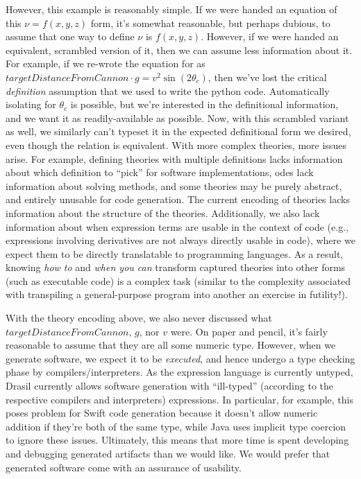 However, this example is reasonably simple. If we were handed an equation of
this \(\nu{} = f(x,y,z)\) form, it's somewhat reasonable, but perhaps dubious,
to assume that one way to define \(\nu{}\) is \(f(x,y,z)\). However, if we were
handed an equivalent, scrambled version of it, then we can assume less
information about it. For example, if we re-wrote the equation for
 as \(\mathit{targetDistanceFromCannon} \cdot{}
g = v^2\sin{}(2\theta{}_c)\), then we've lost the critical \textit{definition}
assumption that we used to write the python code. Automatically isolating for
\(\theta_c\) is possible, but we're interested in the definitional information,
and we want it as readily-available as possible. Now, with this scrambled
variant as well, we similarly can't typeset it in the expected definitional form
we desired, even though the relation is equivalent. With more complex theories,
more issues arise. For example, defining theories with multiple definitions
lacks information about which definition to ``pick'' for software
implementations, \acsp{ode} lack information about solving methods, and some
theories may be purely abstract, and entirely unusable for code generation. The
current encoding of theories lacks information about the structure of the
theories. Additionally, we also lack information about when expression terms are
usable in the context of code (e.g., expressions involving derivatives are not
always directly usable in code), where we expect them to be directly
translatable to programming languages. As a result, knowing \textit{how to} and
\textit{when you can} transform captured theories into other forms (such as
executable code) is a complex task (similar to the complexity associated with
transpiling a general-purpose program into another \textemdash{} an exercise in
futility!).

With the theory encoding above, we also never discussed what
\(\mathit{targetDistanceFromCannon}\), \(g\), nor \(v\) were. On paper and
pencil, it's fairly reasonable to assume that they are all some numeric type.
However, when we generate software, we expect it to be \textit{executed}, and
hence undergo a type checking phase by compilers/interpreters. As the expression
language is currently untyped, Drasil currently allows software generation with
``ill-typed'' (according to the respective compilers and interpreters)
expressions. In particular, for example, this poses problem for Swift code
generation because it doesn't allow numeric addition if they're both of the same
type, while Java uses implicit type coercion to ignore these issues. Ultimately,
this means that more time is spent developing and debugging generated artifacts
than we would like. We would prefer that generated software come with an
assurance of usability.

